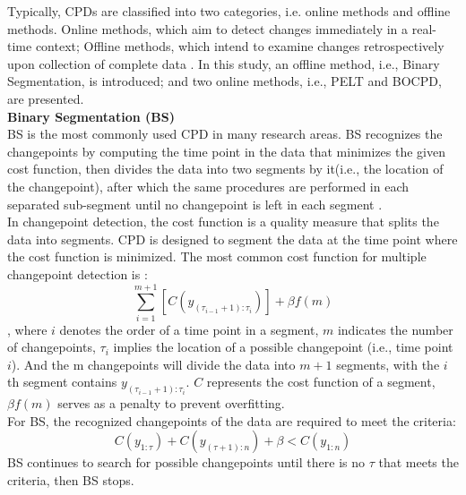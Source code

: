 \documentclass[]{interact}
\theoremstyle{plain}%
\theoremstyle{definition}
\theoremstyle{remark}
\begin{document}
{	Typically, CPDs are classified into two categories, i.e. online methods and offline methods. Online methods, which aim to detect changes immediately in a real-time context; Offline methods, which intend to examine changes retrospectively upon collection of complete data \cite{truongSelectiveReviewOffline2020}. In this study, an offline method, i.e., Binary Segmentation, is introduced; and two online methods, i.e., PELT and BOCPD, are presented. \\
	
	\hspace{-0.55cm} \textbf{Binary Segmentation (BS)}\\
	
	BS is the most commonly used CPD in many research areas. BS recognizes the changepoints by computing the time point in the data that minimizes the given cost function, then divides the data into two segments by it(i.e., the location of the changepoint), after which the same procedures are performed in each separated sub-segment until no changepoint is left in each segment \cite{killickOptimalDetectionChangepoints2012}. \\
	
	In changepoint detection, the cost function is a quality measure that splits the data into segments. CPD is designed to segment the data at the time point where the cost function is minimized. The most common cost function for multiple changepoint detection is \cite{killickOptimalDetectionChangepoints2012}:
	\begin{equation} \label{8}
		\sum_{i = 1} ^{m + 1} \left[C(y_{({\tau_{i-1} + 1}):\tau_{i}}) \right] + \beta f(m)
	\end{equation}
	, where $i$ denotes the order of a time point in a segment, $m$ indicates the number of changepoints, $\tau_i$ implies the location of a possible changepoint (i.e., time point $i$). And the m changepoints will divide the data into $m+1$ segments, with the $i$th segment contains $y_{({\tau_{i-1} + 1}):\tau_{i}}$. $C$ represents the cost function of a segment, $\beta f(m)$ serves as a penalty to prevent overfitting. \\
	
	For BS, the recognized changepoints of the data are required to meet the criteria:
	\begin{equation} \label{9}
		C(y_{1:\tau}) + C(y_{({\tau + 1}):n}) + \beta < C(y_{1:n})
	\end{equation}
	BS continues to search for possible changepoints until there is no $\tau$ that meets the criteria, then BS stops. \\
	
}
\end{document}
